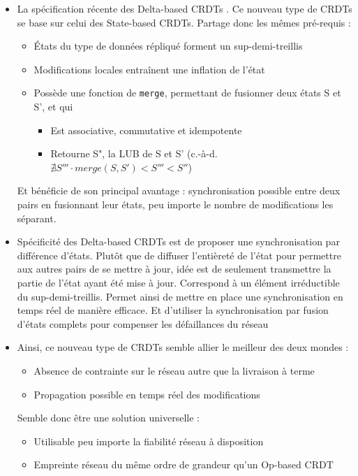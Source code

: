\documentclass[12pt]{thesul}
\newcommand{\ie}{c.-à-d. }
\begin{document}
\begin{itemize}
  \item La spécification récente des Delta-based CRDTs .
    Ce nouveau type de CRDTs se base sur celui des State-based CRDTs.
    Partage donc les mêmes pré-requis :
    \begin{itemize}
      \item États du type de données répliqué forment un sup-demi-treillis
      \item Modifications locales entraînent une inflation de l'état
      \item Possède une fonction de \texttt{merge}, permettant de fusionner deux états S et S', et qui
      \begin{itemize}
        \item Est associative, commutative et idempotente
        \item Retourne S", la \ac{LUB} de S et S' (\ie $\nexists S''' \cdot merge(S, S') < S''' < S''$)
      \end{itemize}
    \end{itemize}
    Et bénéficie de son principal avantage : synchronisation possible entre deux pairs en fusionnant leur états, peu importe le nombre de modifications les séparant.
  \item Spécificité des Delta-based CRDTs est de proposer une synchronisation par différence d'états.
    Plutôt que de diffuser l'entièreté de l'état pour permettre aux autres pairs de se mettre à jour, idée est de seulement transmettre la partie de l'état ayant été mise à jour.
    Correspond à un élément irréductible du sup-demi-treillis.
    Permet ainsi de mettre en place une synchronisation en temps réel de manière efficace.
    Et d'utiliser la synchronisation par fusion d'états complets pour compenser les défaillances du réseau
  \item Ainsi, ce nouveau type de CRDTs semble allier le meilleur des deux mondes :
    \begin{itemize}
      \item Absence de contrainte sur le réseau autre que la livraison à terme
      \item Propagation possible en temps réel des modifications
    \end{itemize}
    Semble donc être une solution universelle :
    \begin{itemize}
      \item Utilisable peu importe la fiabilité réseau à disposition
      \item Empreinte réseau du même ordre de grandeur qu'un Op-based CRDT

\end{itemize}
\end{itemize}
\end{document}

